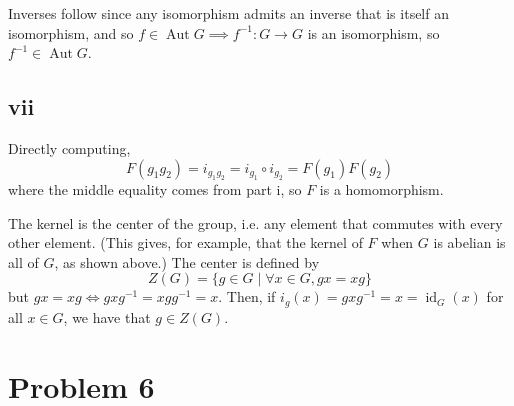 \documentclass[12pt,letterpaper]{article}
\theoremstyle{definition}
\DeclareMathOperator{\Id}{id}
\DeclareMathOperator{\Aut}{Aut}
\begin{document}
Inverses follow since any isomorphism admits an inverse that is itself an isomorphism, and so $f \in \Aut G \implies f^{-1}: G \rightarrow G$ is an isomorphism, so $f^{-1} \in \Aut G$.

\subsection*{vii}

Directly computing,
\[
  F(g_{1}g_{2}) = i_{g_{1}g_{2}} = i_{g_{1}} \circ i_{g_{2}} = F(g_{1})F(g_{2})
\]
where the middle equality comes from part i, so $F$ is a homomorphism.

The kernel is the center of the group, i.e. any element that commutes with every other element. (This gives, for example, that the kernel of $F$ when $G$ is abelian is all of $G$, as shown above.) The center is defined by
\[
  Z(G) = \{g \in G \mid \forall x \in G, gx = xg\}
\]
but $gx = xg \iff gxg^{-1} = xgg^{-1} = x$. Then, if $i_{g}(x) = gxg^{-1} = x = \Id_{G}(x)$ for all $x \in G$, we have that $g \in Z(G)$.

\section*{Problem 6}
\end{document}
